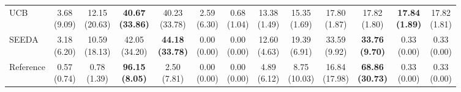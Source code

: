 {\begin{tabular}{l|cccccc|cccccc}
UCB & \makecell{3.68 \\ (9.09)} & \makecell{12.15 \\ (20.63)} & {\cellcolor[HTML]{C8E6C9}} \bfseries \makecell{40.67 \\ (33.86)} & \makecell{40.23 \\ (33.78)} & \makecell{2.59 \\ (6.30)} & \makecell{0.68 \\ (1.04)} & \makecell{13.38 \\ (1.49)} & \makecell{15.35 \\ (1.69)} & {\cellcolor[HTML]{C8E6C9}} \makecell{17.80 \\ (1.87)} & \makecell{17.82 \\ (1.80)} & \bfseries \makecell{17.84 \\ (1.89)} & \makecell{17.82 \\ (1.81)} \\
SEEDA & \makecell{3.18 \\ (6.20)} & \makecell{10.59 \\ (18.13)} & {\cellcolor[HTML]{C8E6C9}} \makecell{42.05 \\ (34.20)} & \bfseries \makecell{44.18 \\ (33.78)} & \makecell{0.00 \\ (0.00)} & \makecell{0.00 \\ (0.00)} & \makecell{12.60 \\ (4.63)} & \makecell{19.39 \\ (6.91)} & {\cellcolor[HTML]{C8E6C9}} \makecell{33.59 \\ (9.92)} & \bfseries \makecell{33.76 \\ (9.70)} & \makecell{0.33 \\ (0.00)} & \makecell{0.33 \\ (0.00)} \\
Reference & \makecell{0.57 \\ (0.74)} & \makecell{0.78 \\ (1.39)} & {\cellcolor[HTML]{C8E6C9}} \bfseries \makecell{96.15 \\ (8.05)} & \makecell{2.50 \\ (7.81)} & \makecell{0.00 \\ (0.00)} & \makecell{0.00 \\ (0.00)} & \makecell{4.89 \\ (6.12)} & \makecell{8.75 \\ (10.03)} & {\cellcolor[HTML]{C8E6C9}} \makecell{16.84 \\ (17.98)} & \bfseries \makecell{68.86 \\ (30.73)} & \makecell{0.33 \\ (0.00)} & \makecell{0.33 \\ (0.00)} \\

\end{tabular}}
